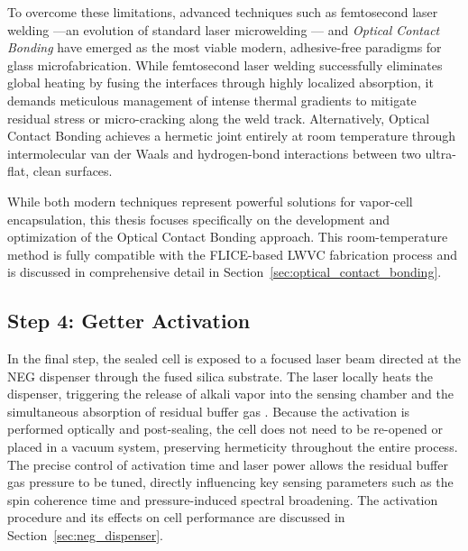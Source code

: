 To overcome these limitations, advanced techniques such as femtosecond laser 
welding ---an evolution of standard laser microwelding \cite{wlodarczyk2019}--- 
and \textit{Optical Contact Bonding} \cite{gosele2006} have emerged as the most viable modern, 
adhesive-free paradigms for glass microfabrication. While femtosecond laser 
welding successfully 
eliminates global heating by fusing the interfaces through highly localized absorption, 
it demands meticulous management of intense thermal gradients to mitigate residual 
stress or micro-cracking along the weld track. Alternatively, 
Optical Contact Bonding achieves a hermetic joint entirely at room temperature through 
intermolecular van der Waals and hydrogen-bond interactions between two ultra-flat, 
clean surfaces. 

While both modern techniques represent powerful 
solutions for vapor-cell encapsulation, this thesis focuses specifically on the 
development and optimization of the Optical Contact Bonding approach. This 
room-temperature method is fully compatible with the FLICE-based LWVC fabrication 
process and is discussed in comprehensive detail in 
Section~\ref{sec:optical_contact_bonding}.
\subsection*{Step 4: Getter Activation}
In the final step, the sealed cell is exposed to a focused laser beam directed at the 
NEG dispenser through the fused silica substrate. The laser locally heats the 
dispenser, triggering the release of alkali vapor into the sensing chamber and the 
simultaneous absorption of residual buffer gas \cite{lucivero2022}. Because the 
activation is performed optically and post-sealing, the cell does not need to be 
re-opened or placed in a vacuum system, preserving hermeticity throughout the entire 
process. The precise control of activation time and laser power allows the residual 
buffer gas pressure to be tuned, directly influencing key sensing parameters such as 
the spin coherence time and pressure-induced spectral broadening. The activation 
procedure and its effects on cell performance are discussed in 
Section~\ref{sec:neg_dispenser}.